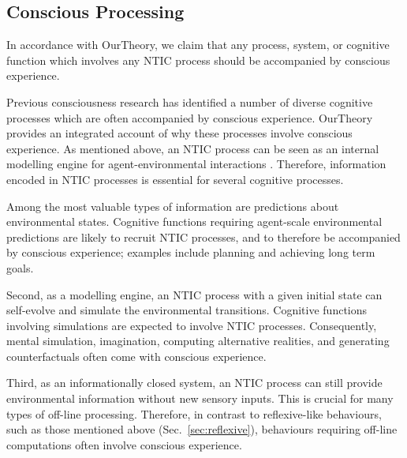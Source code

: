 \documentclass[utf8]{article}
\begin{document}
                
                
                



		\subsection{Conscious Processing}\label{sec:conscious processing}
		    In accordance with \ac{OurTheory}, we claim that any process, system, or cognitive function which involves any NTIC process should be accompanied by conscious experience. 
		    
		    Previous consciousness research has identified a number of diverse cognitive processes which are often accompanied by conscious experience. \ac{OurTheory} provides an integrated account of why these processes involve conscious experience. As mentioned above, an NTIC process can be seen as an internal modelling engine for agent-environmental interactions \citep{BERTSCHINGER.2006}. Therefore, information encoded in NTIC processes is essential for several cognitive processes. 
		    
		    Among the most valuable types of information are predictions about environmental states. Cognitive functions requiring agent-scale environmental predictions are likely to recruit NTIC processes, and to therefore be accompanied by conscious experience; examples include planning and achieving long term goals.
		   
            Second, as a modelling engine, an NTIC process with a given initial state can self-evolve and simulate the environmental transitions. Cognitive functions involving simulations are expected to involve NTIC processes. Consequently, mental simulation, imagination, computing alternative realities, and generating counterfactuals often come with conscious experience. 
            
    	    Third, as an informationally closed system, an NTIC process can still provide environmental information without new sensory inputs. This is crucial for many types of off-line processing. Therefore, in contrast to reflexive-like behaviours, such as those mentioned above (Sec.~\ref{sec:reflexive}), behaviours requiring off-line computations \citep{milner1999paradoxical, himmelbach2005dorsal,revol2003pointing} often involve conscious experience. 
    	    
\end{document}
